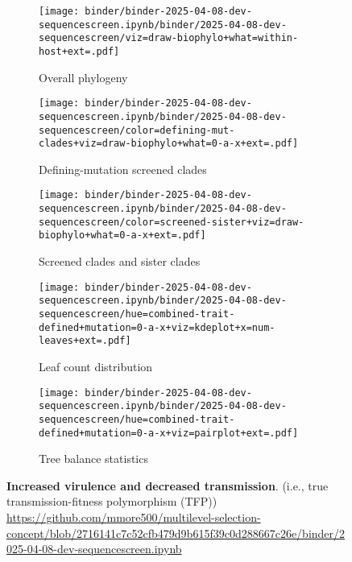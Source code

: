 \begin{figure*}[htbp]
  \centering
  \begin{subfigure}{0.32\textwidth}
    \centering
    \texttt{[image: binder/binder-2025-04-08-dev-sequencescreen.ipynb/binder/2025-04-08-dev-sequencescreen/viz=draw-biophylo+what=within-host+ext=.pdf]}
    \caption{Overall phylogeny}
    \label{fig:dev-sequencescreen:overall_phylogeny}
  \end{subfigure}
  \hfill
  \begin{subfigure}{0.32\textwidth}
    \centering
    \texttt{[image: binder/binder-2025-04-08-dev-sequencescreen.ipynb/binder/2025-04-08-dev-sequencescreen/color=defining-mut-clades+viz=draw-biophylo+what=0-a-x+ext=.pdf]}
    \caption{Defining-mutation screened clades}
    \label{fig:dev-sequencescreen:defining_mut_clades}
  \end{subfigure}
  \hfill
  \begin{subfigure}{0.32\textwidth}
    \centering
    \texttt{[image: binder/binder-2025-04-08-dev-sequencescreen.ipynb/binder/2025-04-08-dev-sequencescreen/color=screened-sister+viz=draw-biophylo+what=0-a-x+ext=.pdf]}
    \caption{Screened clades and sister clades}
    \label{fig:dev-sequencescreen:screened_sister}
  \end{subfigure}

  \vspace{0.5cm} %

  \begin{subfigure}{0.54\textwidth}
    \centering
    \texttt{[image: binder/binder-2025-04-08-dev-sequencescreen.ipynb/binder/2025-04-08-dev-sequencescreen/hue=combined-trait-defined+mutation=0-a-x+viz=kdeplot+x=num-leaves+ext=.pdf]}
    \caption{Leaf count distribution}
    \label{fig:dev-sequencescreen:leaf_count}
  \end{subfigure}
  \hfill
  \begin{subfigure}{0.44\textwidth}
    \centering
    \texttt{[image: binder/binder-2025-04-08-dev-sequencescreen.ipynb/binder/2025-04-08-dev-sequencescreen/hue=combined-trait-defined+mutation=0-a-x+viz=pairplot+ext=.pdf]}
    \caption{Tree balance statistics}
    \label{fig:dev-sequencescreen:tree_balance}
  \end{subfigure}

  \caption{\textbf{Increased virulence and decreased transmission}. (i.e., true transmission-fitness polymorphism (TFP)) \url{https://github.com/mmore500/multilevel-selection-concept/blob/2716141c7c52cfb479d9b615f39c0d288667c26e/binder/2025-04-08-dev-sequencescreen.ipynb}}
  \label{fig:dev-sequencescreen}
\end{figure*}
